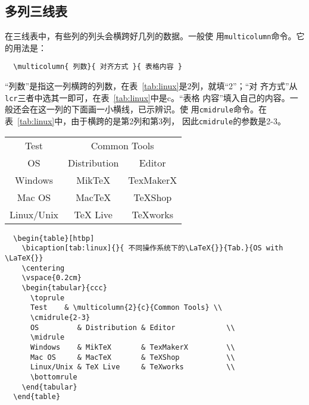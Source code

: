 \subsection{多列三线表}

在三线表中，有些列的列头会横跨好几列的数据。一般使
用\texttt{multicolumn}命令。它的用法是：
\begin{lstlisting}
  \multicolumn{ 列数}{ 对齐方式 }{ 表格内容 }
\end{lstlisting}

“列数”是指这一列横跨的列数，在表~\ref{tab:linux}是2列，就填“2”；“对
齐方式”从\texttt{lcr}三者中选其一即可，在表~\ref{tab:linux}中是c。“表格
内容”填入自己的内容。一般还会在这一列的下面画一小横线，已示辨识。使
用\texttt{cmidrule}命令。在表~\ref{tab:linux}中，由于横跨的是第2列和第3列，
因此\texttt{cmidrule}的参数是2-3。

\begin{table}[htbp]
  \centering
  \vspace{0.2cm}
  \begin{tabular}{ccc}
    \toprule
    Test    & \multicolumn{2}{c}{Common Tools} \\
    \cmidrule{2-3}
    OS         & Distribution & Editor            \\
    \midrule
    Windows    & MikTeX       & TexMakerX         \\
    Mac OS     & MacTeX       & TeXShop           \\
    Linux/Unix & TeX Live     & TeXworks          \\
    \bottomrule
  \end{tabular}
\end{table}


\begin{lstlisting}
  \begin{table}[htbp]
    \bicaption[tab:linux]{}{ 不同操作系统下的\LaTeX{}}{Tab.}{OS with \LaTeX{}}
    \centering
    \vspace{0.2cm}
    \begin{tabular}{ccc}
      \toprule
      Test    & \multicolumn{2}{c}{Common Tools} \\
      \cmidrule{2-3}
      OS         & Distribution & Editor            \\
      \midrule
      Windows    & MikTeX       & TexMakerX         \\
      Mac OS     & MacTeX       & TeXShop           \\
      Linux/Unix & TeX Live     & TeXworks          \\
      \bottomrule
    \end{tabular}
  \end{table}
\end{lstlisting}

